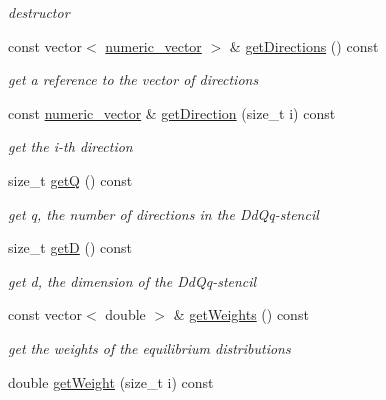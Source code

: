 \begin{DoxyCompactItemize}
\begin{DoxyCompactList}\small\item\em destructor \item\end{DoxyCompactList}\item 
const vector$<$ \hyperlink{namespacenatrium_a67c39077adc6634f8fa3762b8eef24c4}{numeric\_\-vector} $>$ \& \hyperlink{classnatrium_1_1Stencil_a02dbfdb70b94a32f477a6ac57ed14f5e}{getDirections} () const 
\begin{DoxyCompactList}\small\item\em get a reference to the vector of directions \item\end{DoxyCompactList}\item 
const \hyperlink{namespacenatrium_a67c39077adc6634f8fa3762b8eef24c4}{numeric\_\-vector} \& \hyperlink{classnatrium_1_1Stencil_a76b179032543b3436dea199beceab000}{getDirection} (size\_\-t i) const 
\begin{DoxyCompactList}\small\item\em get the i-\/th direction \item\end{DoxyCompactList}\item 
size\_\-t \hyperlink{classnatrium_1_1Stencil_a9c42c1e1fbc5308a8ba1281eb5e4be18}{getQ} () const 
\begin{DoxyCompactList}\small\item\em get q, the number of directions in the DdQq-\/stencil \item\end{DoxyCompactList}\item 
size\_\-t \hyperlink{classnatrium_1_1Stencil_a55ee00e8c03b266c7eeed3964d2c93bf}{getD} () const 
\begin{DoxyCompactList}\small\item\em get d, the dimension of the DdQq-\/stencil \item\end{DoxyCompactList}\item 
const vector$<$ double $>$ \& \hyperlink{classnatrium_1_1Stencil_a35c26427afdd33c3477b60be157e5bc8}{getWeights} () const 
\begin{DoxyCompactList}\small\item\em get the weights of the equilibrium distributions \item\end{DoxyCompactList}\item 
double \hyperlink{classnatrium_1_1Stencil_ae5cb8bd1a305ed29c779725f489bb855}{getWeight} (size\_\-t i) const 

\end{DoxyCompactItemize}
